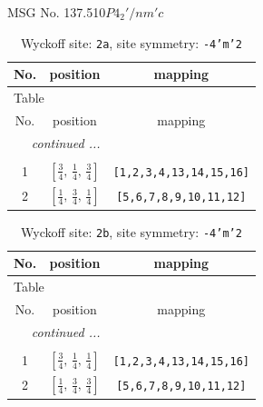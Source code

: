 \documentclass[fleqn,8pt]{jsarticle}
\begin{document}
\setcounter{MaxMatrixCols}{32}

\renewcommand{\tablename}{Table~}
\renewcommand{\figurename}{Figure~}
\begin{center}
\LARGE
MSG No. 137.510\quad$P4_{2}'/nm'c$
\end{center}
\renewcommand{\arraystretch}{1.2}
\begin{longtable}{ccc}
\caption{Wyckoff site: {\tt 2a}, site symmetry: {\tt -4'm'2}}
 \\
 \hline \hline
No. & position & mapping \\ \hline \endfirsthead

\multicolumn{2}{l}{\tablename\ \thetable{}} \\
 \hline \hline
No. & position & mapping \\ \hline \endhead

 \hline \hline
\multicolumn{2}{r}{\footnotesize\it continued ...} \\ \endfoot

 \hline \hline
\multicolumn{2}{r}{} \\ \endlastfoot

1 & $\left[ \frac{3}{4},\, \frac{1}{4},\, \frac{3}{4} \right]$ & {\tt [1,2,3,4,13,14,15,16]} \\ \hline
2 & $\left[ \frac{1}{4},\, \frac{3}{4},\, \frac{1}{4} \right]$ & {\tt [5,6,7,8,9,10,11,12]} \\
\end{longtable}
\renewcommand{\arraystretch}{1.2}
\begin{longtable}{ccc}
\caption{Wyckoff site: {\tt 2b}, site symmetry: {\tt -4'm'2}}
 \\
 \hline \hline
No. & position & mapping \\ \hline \endfirsthead

\multicolumn{2}{l}{\tablename\ \thetable{}} \\
 \hline \hline
No. & position & mapping \\ \hline \endhead

 \hline \hline
\multicolumn{2}{r}{\footnotesize\it continued ...} \\ \endfoot

 \hline \hline
\multicolumn{2}{r}{} \\ \endlastfoot

1 & $\left[ \frac{3}{4},\, \frac{1}{4},\, \frac{1}{4} \right]$ & {\tt [1,2,3,4,13,14,15,16]} \\ \hline
2 & $\left[ \frac{1}{4},\, \frac{3}{4},\, \frac{3}{4} \right]$ & {\tt [5,6,7,8,9,10,11,12]} \\
\end{longtable}
\end{document}
